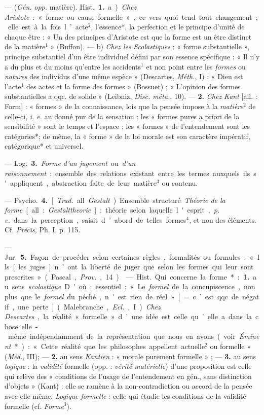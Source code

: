\begin{itemize}[leftmargin=1cm, label=, itemsep=1pt]
 — ({\it Gén.} {\it opp.} matière). \si{Hist.} {\bf 1.} a) {\it Chez
Aristote} : « forme ou cause formelle », ce vers quoi tend tout changement ;
elle est à la fois l’acte$^2$, l'essence*, la perfection et le principe
d'unité de chaque être : « Un des principes d’Aristote est que la forme est
un être distinct de la matière$^1$ » (Buffon). — b) {\it Chez les
Scolastiques} : « forme substantielle », principe substantiel d’un être
individuel défini par son essence spécifique : « Il n’y a du plus et du moins
qu'entre les accidents$^1$ et non point entre les {\it formes} ou
{\it natures} des individus d’une même espèce » (Descartes, {\it Méth.}, I) :
« Dieu est l’acte$^1$ des actes et la forme des formes » (Bossuet) ;
« L'opinion des formes substantielles a qqc. de solide » (Leibniz,
{\it Disc. méta.}, 10). — {\bf 2.} {\it Chez Kant} [all. : Form] : « formes »
de la connaissance, lois que la pensée impose à la {\it matière}$^2$ de
celle-ci, {\it i. e.} au donné pur de la sensation : les « formes pures a
priori de la sensibilité » sont le temps et l’espace ; les « formes » de
l’entendement sont les catégories*; de même, la « forme » de la loi morale
est son caractère impératif, catégorique* et universel.

— \si{Log.} {\bf 3.} {\it Forme d'un jugement} ou {\it d'un raisonnement} : ensemble des
relations existant entre les termes auxquels ils s'appliquent, abstraction faite de leur matière$^3$ ou contenu.

— \si{Psycho.} {\bf 4.} [{\it Trad.} all. {\it Gestalt}). Ensemble structuré.
{\it Théorie de la forme} [all. : {\it Gestalttheorie}] : théorie selon
laquelle l'esprit, {\it p. e.} dans la perception, saisit d’abord de telles
formes$^4$, et non des éléments. Cf. {\it Précis}, Ph. I, p. 115.

— \si{Jur.} {\bf 5.} Façon de procéder selon certaines règles, formalités ou
formules : « Ils [les juges] n’ont la liberté de juger que selon les formes
qui leur sont prescrites » (Pascal, {\it Prov.}, 14).

 — \si{Hist.} Qui concerne la forme* : {\bf 1.} au sens
{\it scolastique}. D'où : essentiel : « Le {\it formel} de la concupiscence,
non plus que le {\it formel} du péché, n'est rien de réel » [= c’est qqc. de
négatif, une perte] (Malebranche, {\it Ecl.}, I). {\it Chez Descartes}, la
réalité « formelle » d’une idée est celle qu’elle a dans la chose elle-même
indépendamment de la représentation que nous en avons (voir {\it Éminent}*) :
« Cette réalité que les philosophes appellent actuelle$^2$ ou formelle »
({\it Méd.}, III); — {\bf 2.} au sens {\it Kantien} : « morale purement
formelle » ; — {\bf 3.} au sens {\it logique} : la {\it validité} formelle
(opp. : {\it vérité matérielle}) d’une proposition est celle qui relève des
« conditions de l’usage de l’entendement en gén., sans distinction
d'objets » (Kant) : elle se ramène à la non-contradiction ou accord de la
pensée avec elle-même. {\it Logique formelle} : celle qui étudie les
conditions de la validité formelle (cf. {\it Forme}$^3$).


\end{itemize}
